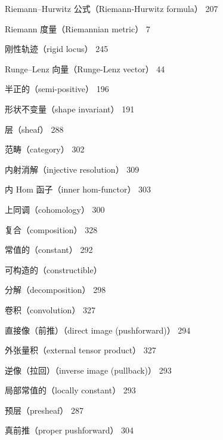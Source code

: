 {\noindent Riemann–Hurwitz 公式（Riemann-Hurwitz formula） 207\par
\noindent Riemann 度量（Riemannian metric） 7\par
\noindent 刚性轨迹（rigid locus） 245\par
\noindent Runge–Lenz 向量（Runge-Lenz vector） 44\par
\noindent 半正的（semi-positive） 196\par
\noindent 形状不变量（shape invariant） 191\par
\noindent 层（sheaf） 288\par
\noindent\hspace*{1.5em}范畴（category） 302\par
\noindent\hspace*{3em}内射消解（injective resolution） 309\par
\noindent\hspace*{3em}内 Hom 函子（inner hom-functor） 303\par
\noindent\hspace*{1.5em}上同调（cohomology） 300\par
\noindent\hspace*{1.5em}复合（composition） 328\par
\noindent\hspace*{1.5em}常值的（constant） 292\par
\noindent\hspace*{1.5em}可构造的（constructible）\par
\noindent\hspace*{3em}分解（decomposition） 298\par
\noindent\hspace*{1.5em}卷积（convolution） 327\par
\noindent\hspace*{1.5em}直接像（前推）（direct image (pushforward)） 294\par
\noindent\hspace*{1.5em}外张量积（external tensor product） 327\par
\noindent\hspace*{1.5em}逆像（拉回）（inverse image (pullback)） 293\par
\noindent\hspace*{1.5em}局部常值的（locally constant） 293\par
\noindent\hspace*{1.5em}预层（presheaf） 287\par
\noindent\hspace*{1.5em}真前推（proper pushforward） 304\par
}
